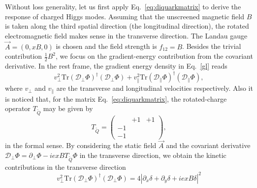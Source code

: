 \documentclass[12pt]{article}
\begin{document}
Without loss generality, let us first apply Eq.~\eqref{eq:diquarkmatrix} to
derive the response of charged Higgs modes. Assuming that the unscreened
magnetic field $B$ is taken along the third spatial direction (the longitudinal
direction), the rotated electromagnetic field makes sense in the transverse
direction. The Landau gauge $\vec{A} = (0,xB,0)$ is chosen and the field 
strength is $f_{12} =B$. Besides the trivial contribution $\frac{1}{2}B^2$,
we focus on the gradient-energy contribution from the covariant derivative.
In the rest frame, the gradient energy density in Eq.~\eqref{gl} reads
\begin{equation}
 v_\perp^2\text{Tr}(\mathcal{D}_\perp \Phi)^\dagger(\mathcal{D}_\perp \Phi)
+ v_\parallel^2\text{Tr}(\mathcal{D}_\parallel\Phi)^\dagger(\mathcal{D}_\parallel \Phi),
\end{equation}
where $v_\perp$ and $v_\parallel$ are the transverse and longitudinal
velocities respectively. Also it is noticed that, for the matrix Eq.~\eqref{eq:diquarkmatrix},
the rotated-charge operator $T_{\widetilde{Q}}$ may be given by
\begin{equation}
  T_{\widetilde{Q}} = \begin{pmatrix}
              &    +1  & +1\\
      -1 &            &      \\
      -1 &            &
  \end{pmatrix},
  \end{equation}
in the formal sense.
By considering the static field $\vec{A}$ and the covariant derivative
$\mathcal{D}_\perp \Phi = \partial_\perp \Phi - iexBT_{\widetilde{Q}}\Phi$
in the transverse direction, we obtain 
the kinetic contributions in the transverse direction
\begin{equation}
   v_\perp^2\text{Tr}(\mathcal{D}_\perp \Phi)^\dagger(\mathcal{D}_\perp \Phi)
  = 4|\partial_x \delta
  + \partial_y \delta
  + ie xB \delta|^2
\end{equation}
\end{document}
